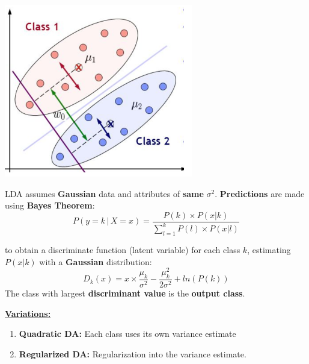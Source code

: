 \documentclass[letterpaper, 10.5pt,landscape]{article}
\begin{document}
\begin{multicols*}{3}
\begin{center}
    \begin{minipage}{0.6\linewidth}
        \includegraphics[width=\textwidth]{figures/linear_discriminant_analysis.PNG}
    \end{minipage}
\end{center}


LDA assumes \textbf{Gaussian} data and attributes of \textbf{same} $\sigma^{2}$. 
\vspace{3pt}
\textbf{Predictions} are made using \textbf{Bayes Theorem}: 
\vspace{-5pt}
\[\boxed{ P(y=k \, | \,  X=x) = \frac{P(k) \times P(x|k)}{\sum^{k}_{l=1} P(l) \times P(x|l) } } \]

to obtain a discriminate function (latent variable) for each class $k$, estimating $P(x|k)$ with a \textbf{Gaussian} distribution:
\vspace{-5pt}
\[\boxed{ D_{k}(x) = x \times \frac{\mu_{k}}{\sigma^{2}} - \frac{\mu_{k}^{2}}{2 \sigma^{2}} + ln(P(k))} \]
The class with largest \textbf{discriminant value} is the \textbf{output class}. 


\vspace{3pt}

\textbf{\underline{Variations:}}
\begin{enumerate}
    \item \textbf{Quadratic DA:} Each class uses its own variance estimate
    \vspace{-2pt}
    \item \textbf{Regularized DA:}  Regularization into the variance estimate.
\end{enumerate}


\end{multicols*}
\end{document}
